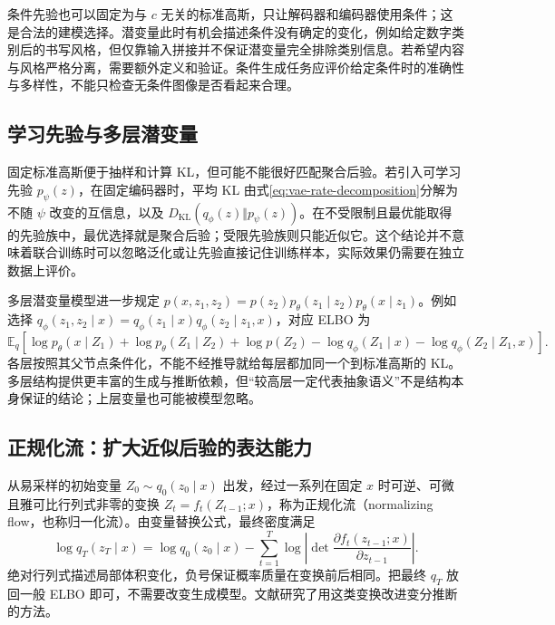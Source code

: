 \documentclass[UTF8,12pt,a4paper,fontset=fandol]{ctexart}
\begin{document}
条件先验也可以固定为与 $c$ 无关的标准高斯，只让解码器和编码器使用条件；这是合法的建模选择。潜变量此时有机会描述条件没有确定的变化，例如给定数字类别后的书写风格，但仅靠输入拼接并不保证潜变量完全排除类别信息。若希望内容与风格严格分离，需要额外定义和验证。条件生成任务应评价给定条件时的准确性与多样性，不能只检查无条件图像是否看起来合理。

\subsection{学习先验与多层潜变量}
固定标准高斯便于抽样和计算 KL，但可能不能很好匹配聚合后验。若引入可学习先验 $p_\psi(z)$，在固定编码器时，平均 KL 由式\eqref{eq:vae-rate-decomposition}分解为不随 $\psi$ 改变的互信息，以及 $D_{\mathrm{KL}}(q_\phi(z)\Vert p_\psi(z))$。在不受限制且最优能取得的先验族中，最优选择就是聚合后验；受限先验族则只能近似它。这个结论并不意味着联合训练时可以忽略泛化或让先验直接记住训练样本，实际效果仍需要在独立数据上评价。

多层潜变量模型进一步规定 $p(x,z_1,z_2)=p(z_2)p_\theta(z_1\mid z_2)p_\theta(x\mid z_1)$。例如选择 $q_\phi(z_1,z_2\mid x)=q_\phi(z_1\mid x)q_\phi(z_2\mid z_1,x)$，对应 ELBO 为
\begin{equation}
 \mathbb E_q\!\left[
 \log p_\theta(x\mid Z_1)+\log p_\theta(Z_1\mid Z_2)+\log p(Z_2)
 -\log q_\phi(Z_1\mid x)-\log q_\phi(Z_2\mid Z_1,x)\right].
 \label{eq:vae-hierarchical}
\end{equation}
各层按照其父节点条件化，不能不经推导就给每层都加同一个到标准高斯的 KL。多层结构提供更丰富的生成与推断依赖，但“较高层一定代表抽象语义”不是结构本身保证的结论；上层变量也可能被模型忽略。

\subsection{正规化流：扩大近似后验的表达能力}
从易采样的初始变量 $Z_0\sim q_0(z_0\mid x)$ 出发，经过一系列在固定 $x$ 时可逆、可微且雅可比行列式非零的变换 $Z_t=f_t(Z_{t-1};x)$，称为正规化流（normalizing flow，也称归一化流）。由变量替换公式，最终密度满足
\begin{equation}
 \log q_T(z_T\mid x)=\log q_0(z_0\mid x)
 -\sum_{t=1}^{T}\log\left|\det
       \frac{\partial f_t(z_{t-1};x)}{\partial z_{t-1}}\right|.
 \label{eq:vae-flow}
\end{equation}
绝对行列式描述局部体积变化，负号保证概率质量在变换前后相同。把最终 $q_T$ 放回一般 ELBO 即可，不需要改变生成模型。文献\cite{rezende2015}研究了用这类变换改进变分推断的方法。
\end{document}
